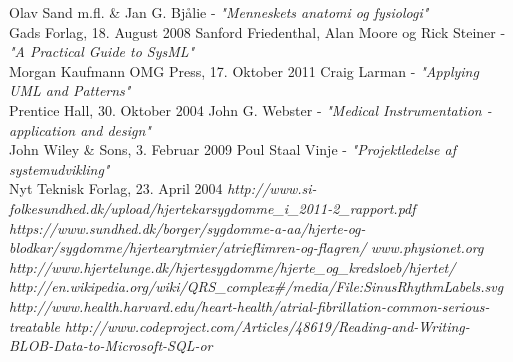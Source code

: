 \begin{thebibliography}{9}
 Olav Sand m.fl. \& Jan G. Bjålie - \textit{"Menneskets anatomi og fysiologi"}\\ Gads Forlag, 18. August 2008
 Sanford Friedenthal, Alan Moore og Rick Steiner - \textit{"A Practical Guide to SysML"} \\Morgan Kaufmann OMG Press, 17. Oktober 2011
 Craig Larman -
	\textit{"Applying UML and Patterns"}\\ Prentice Hall, 30. Oktober 2004
 John G. Webster - \textit{"Medical Instrumentation - application and design"}\\ John Wiley \& Sons, 3. Februar 2009
 Poul Staal Vinje - \textit{"Projektledelse af systemudvikling"}\\ Nyt Teknisk Forlag, 23. April 2004
 \textit{http://www.si-folkesundhed.dk/upload/hjertekarsygdomme\_i\_2011-2\_rapport.pdf}
 \textit{https://www.sundhed.dk/borger/sygdomme-a-aa/hjerte-og-blodkar/sygdomme/hjertearytmier/atrieflimren-og-flagren/}
 \textit{www.physionet.org}
\textit{http://www.hjertelunge.dk/hjertesygdomme/hjerte\_og\_kredsloeb/hjertet/}
 \textit{http://en.wikipedia.org/wiki/QRS\_complex\#/media/File:SinusRhythmLabels.svg}
 \textit{http://www.health.harvard.edu/heart-health/atrial-fibrillation-common-serious-treatable}
 \textit{http://www.codeproject.com/Articles/48619/Reading-and-Writing-BLOB-Data-to-Microsoft-SQL-or}


\end{thebibliography}




